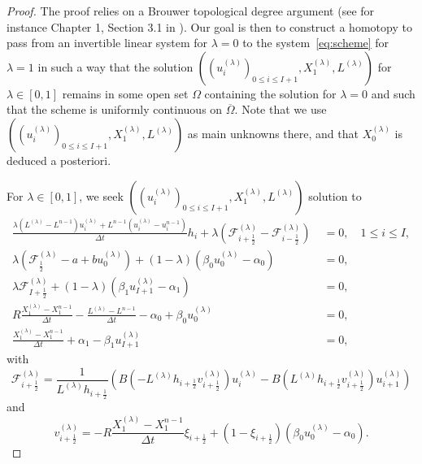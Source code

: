 \documentclass{amsart}
\newcommand\dt{\Delta t}
\newcommand\h[1]{h_{#1 \frac{1}{2}}}
\newcommand\Ff{{\mathcal F}}
\begin{document}
				\begin{proof}
The proof relies on a Brouwer topological degree argument (see for instance Chapter 1, Section 3.1 in \cite{Deimling}). Our goal is then to construct a homotopy to pass from an invertible linear system for $\lambda = 0$ to the system~\eqref{eq:scheme} for $\lambda = 1$ in such a way that the solution $((u_i^{(\lambda)})_{0 \leq i \leq I+1}, X_1^{(\lambda)}, L^{(\lambda)})$ for $\lambda \in [0,1]$ remains in some open set $\Omega$ containing the solution for $\lambda = 0$ and such that the scheme is uniformly continuous on $\overline \Omega$. Note that we use $((u_i^{(\lambda)})_{0 \leq i \leq I+1}, X_1^{(\lambda)}, L^{(\lambda)})$ as main unknowns there, and that $X_0^{(\lambda)}$ is deduced a posteriori. 

For $\lambda \in [0,1]$, we seek $((u_i^{(\lambda)})_{0 \leq i \leq I+1}, X_1^{(\lambda)}, L^{(\lambda)})$ solution to 
\begin{align*}
\frac{\lambda (L^{(\lambda)} - L^{n-1}) u_i^{(\lambda)} + L^{n-1}(u_i^{(\lambda)} - u_i^{n-1})}{\dt} h_i + \lambda\left( \Ff_{i+\frac12}^{(\lambda)} -  \Ff_{i-\frac12}^{(\lambda)} \right) &\;= 0, \quad 1 \leq i \leq I,  \\
\lambda \left( \Ff_{\frac12}^{(\lambda)} - a + b u_0^{(\lambda)} \right) + (1-\lambda) \left( \beta_0  u_0^{(\lambda)} - \alpha_0 \right) &\; = 0, \\
\lambda \Ff_{I+\frac12}^{(\lambda)} + (1-\lambda) \left( \beta_1 u_{I+1}^{(\lambda)} - \alpha_1 \right) & \; = 0, \\
R \frac{X_1^{(\lambda)} - X_1^{n-1}}{\dt} - \frac{L^{(\lambda)} - L^{n-1}}{\dt} - \alpha_0 + \beta_0 u_0^{(\lambda)} &\;= 0, \\
\frac{X_1^{(\lambda)} - X_1^{n-1}}{\dt} + \alpha_1 - \beta_1 u_{I+1}^{(\lambda)} &\;= 0, 
\end{align*}
with 
\[
 \Ff_{i+\frac12}^{(\lambda)}  = \frac{1}{L^{(\lambda)}\h{i+}} \left( B\left(-L^{(\lambda)} h_{i+\frac12} v_{i+\frac12}^{(\lambda)} \right)u_i^{(\lambda)} -B\left(L^{(\lambda)} h_{i+\frac12} v_{i+\frac12}^{(\lambda)} \right)u_{i+1}^{(\lambda)} \right)
\]
and 
\[
 v_{i+\frac12}^{(\lambda)} = - R  \frac{X_1^{(\lambda)} - X_1^{n-1}}{\dt} \xi_{i+\frac12} + (1 - \xi_{i+\frac12}) ( \beta_0 u_0^{(\lambda)} - \alpha_0).
\]


\end{proof}
\end{document}
